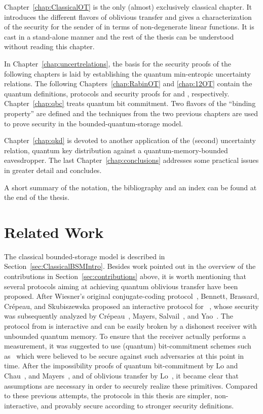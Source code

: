 Chapter~\ref{chap:ClassicalOT} is the only (almost) exclusively
classical chapter. It introduces the different flavors of oblivious
transfer and gives a characterization of the security for the sender
of \OT in terms of non-degenerate linear functions. It is cast in a
stand-alone manner and the rest of the thesis can be understood
without reading this chapter.

In Chapter~\ref{chap:uncertrelations}, the basis for the security
proofs of the following chapters is laid by establishing the quantum
min-entropic uncertainty relations. The following
Chapters~\ref{chap:RabinOT} and \ref{chap:12OT} contain the quantum
definitions, protocols and security proofs for \RabinOT and \OT,
respectively. Chapter~\ref{chap:qbc} treats quantum bit commitment.
Two flavors of the ``binding property'' are defined and the techniques
from the two previous chapters are used to prove security in the
bounded-quantum-storage model.

Chapter~\ref{chap:qkd} is devoted to another application of the
(second) uncertainty relation, quantum key distribution against a
quantum-memory-bounded eavesdropper. The last
Chapter~\ref{chap:conclusions} addresses some practical issues in
greater detail and concludes.

A short summary of the notation, the bibliography and an index
can be found at the end of the thesis.


\section{Related Work}
The classical bounded-storage model is described in
Section~\ref{sec:ClassicalBSMIntro}. Besides work pointed out
in the overview of the contributions in
Section~\ref{sec:contributions} above, it is worth mentioning that several protocols aiming at achieving quantum oblivious transfer have been proposed. After Wiesner's original conjugate-coding protocol~\cite{Wiesner83}, Bennett, Brassard, Cr\'epeau, and Skubiszewska proposed an interactive protocol for \OT~\cite{BBCS91}, whose security was subsequently analyzed by Cr\'epeau~\cite{Crepeau94}, Mayers, Salvail~\cite{MS94, Mayers95}, and Yao~\cite{Yao95}. The protocol from \cite{BBCS91} is interactive and can be easily broken by a dishonest receiver with unbounded quantum memory. To ensure that the receiver actually performs a measurement, it was suggested to use (quantum) bit-commitment schemes such as~\cite{BCJL93} which were believed to be secure against such adversaries at this point in time. After the impossibility proofs of quantum bit-commitment by Lo and Chau~\cite{LC97}, and Mayers~\cite{Mayers97}, and of oblivious transfer by Lo~\cite{Lo97}, it became clear that assumptions are necessary in order to securely realize these primitives. Compared to these previous attempts, the protocols in this thesis are simpler, non-interactive, and provably secure according to stronger security definitions.

